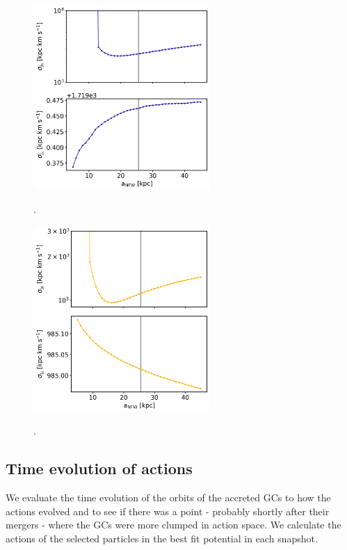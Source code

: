 \begin{figure}%
\captionsetup{format=plain}
\centering
\includegraphics[width=0.6\textwidth]{plots/Dynamics/prog3/a_NFW_diagnostic_plot_std_prog3_all.png}
\label{fig:NFW_diag_prog3}
\caption{.}
\end{figure}


\begin{figure}%
\captionsetup{format=plain}
\centering
\includegraphics[width=0.6\textwidth]{plots/Dynamics/prog4/a_NFW_diagnostic_plot_std_prog4_all.png}
\label{fig:NFW_diag_prog4}
\caption{.}
\end{figure}

\subsection{Time evolution of actions}\label{subsec:time_evo_actions}
We evaluate the time evolution of the orbits of the accreted \acp{GC} to how the actions evolved and to see if there was a point - probably shortly after their mergers - where the \acp{GC} were more clumped in action space. We calculate the actions of the selected particles in the best fit potential in each snapshot.  

